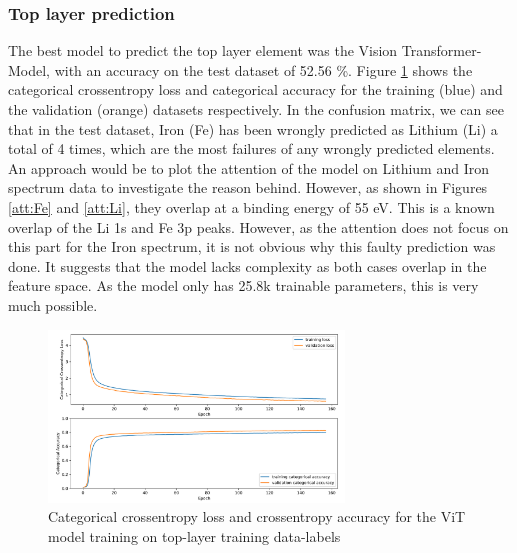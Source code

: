 \subsubsection{Top layer prediction}
The best model to predict the top layer element was the Vision Transformer-Model, with an accuracy on the test dataset of 52.56 \%. Figure \ref{fig:top_best_loss} shows the categorical crossentropy loss and categorical accuracy for the training (blue) and the validation (orange) datasets respectively. In the confusion matrix, we can see that in the test dataset, Iron (Fe) has been wrongly predicted as Lithium (Li) a total of 4 times, which are the most failures of any wrongly predicted elements. An approach would be to plot the attention of the model on Lithium and Iron spectrum data to investigate the reason behind. However, as shown in Figures \ref{att:Fe} and \ref{att:Li}, they overlap at a binding energy of 55 eV. This is a known overlap of the Li 1s and Fe 3p peaks. However, as the attention does not focus on this part for the Iron spectrum, it is not obvious why this faulty prediction was done. It suggests that the model lacks complexity as both cases overlap in the feature space. As the model only has 25.8k trainable parameters, this is very much possible. 


\begin{figure}
    \centering
    \includegraphics[width=0.7\textwidth]{Figures/best_task_1_model_loss.png}
    \caption{Categorical crossentropy loss and crossentropy accuracy for the ViT model training on top-layer training data-labels}
    \label{fig:top_best_loss}
\end{figure}

